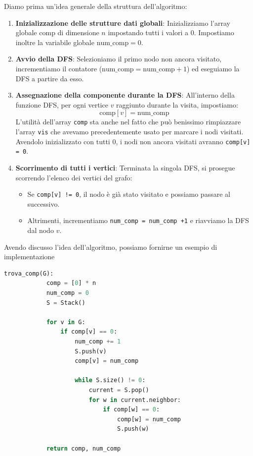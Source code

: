 \documentclass[12pt]{report}
\begin{document}
	Diamo prima un'idea generale della struttura dell'algoritmo:	
	\begin{enumerate}
		\item \textbf{Inizializzazione delle strutture dati globali}:
		Inizializziamo l'array globale $\text{comp}$ di dimensione $n$ impostando tutti i valori a $0$. Impostiamo inoltre la variabile globale $\text{num\_comp} = 0$.
		
		\item \textbf{Avvio della DFS}:
		Selezioniamo il primo nodo non ancora visitato, incrementiamo il contatore ($\text{num\_comp} = \text{num\_comp} + 1$) ed eseguiamo la DFS a partire da esso.
		
		\item \textbf{Assegnazione della componente durante la DFS}:
		All'interno della funzione DFS, per ogni vertice $v$ raggiunto durante la visita, impostiamo:
		\[
		\text{comp}[v] = \text{num\_comp}
		\]
		L'utilità dell'array \texttt{comp} sta anche nel fatto che può benissimo rimpiazzare l'array \texttt{vis} che avevamo precedentemente usato per marcare i nodi visitati. Avendolo inizializzato con tutti 0, i nodi non ancora visitati avranno \texttt{comp[v] = 0}.
		
		\item \textbf{Scorrimento di tutti i vertici}:
		Terminata la singola DFS, si prosegue scorrendo l'elenco dei vertici del grafo:
		\begin{itemize}
			\item Se \texttt{comp[v] != 0}, il nodo è già stato visitato e possiamo passare al successivo.
			\item Altrimenti, incrementiamo \texttt{num\_comp = num\_comp +1} e riavviamo la DFS dal nodo $v$.
		\end{itemize}
	\end{enumerate}
	
	Avendo discusso l'idea dell'algoritmo, possiamo fornirne un esempio di implementazione
	\begin{lstlisting}[style=stile-listings, language=Python]
		trova_comp(G):
			comp = [0] * n
			num_comp = 0
			S = Stack()
			
			for v in G:
				if comp[v] == 0:
					num_comp += 1
					S.push(v)
					comp[v] = num_comp
			
					while S.size() != 0:
						current = S.pop()
						for w in current.neighbor:
							if comp[w] == 0:
								comp[w] = num_comp
								S.push(w)
			
			return comp, num_comp
	\end{lstlisting}
	
\end{document}

